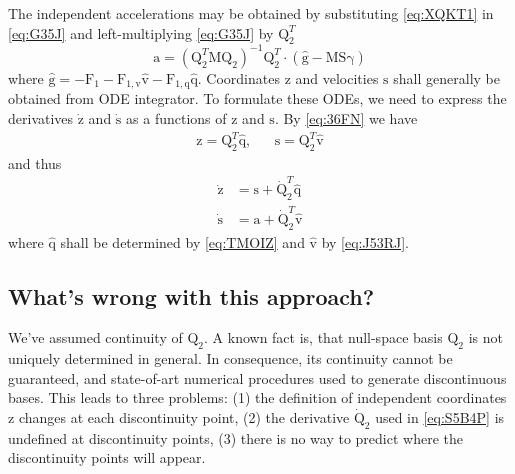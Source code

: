 \documentclass{scrartcl}
\newcommand\mMat[1]{\ensuremath{\boldsymbol{\mathrm{#1}}}}
\newcommand\mVec[1]{\ensuremath{\boldsymbol{\mathrm{#1}}}}
\begin{document}
The independent accelerations may be obtained by substituting \eqref{eq:XQKT1}
in \eqref{eq:G35J} and left-multiplying \eqref{eq:G35J} by $\mMat{Q}_2^T$
\begin{equation}
  \mVec{a} = \left(\mMat{Q}_2^T \mMat{M} \mMat{Q}_2\right)^{-1}
  \mMat{Q}_2^T \cdot \left(
      \mVec{\hat g}
    - \mMat{M} \mMat{S} \mVec{\gamma}
  \right)
\end{equation}
where $\mVec{\hat g} = - \mVec{F}_1  - \mMat{F}_{1,\mVec{v}}
\mVec{\hat v} - \mMat{F}_{1,\mVec{q}} \mVec{\hat q}$.
Coordinates $\mVec{z}$ and velocities $\mVec{s}$ shall
generally be obtained from ODE integrator. To formulate these ODEs, we need
to express the derivatives $\mVec{\dot z}$ and $\mVec{\dot
s}$ as a functions of $\mVec{z}$ and $\mVec{s}$. By
\eqref{eq:36FN} we have
\begin{align}
  & \mVec{z} = \mMat{Q}_2^T \mVec{\hat q}, &
  & \mVec{s} = \mMat{Q}_2^T \mVec{\hat v} &
  \label{eq:71BI}
\end{align}
and thus
\begin{subequations}
\label{eq:S5B4P}
\begin{align}
  \mVec{\dot z}
  & = \mVec{s} + \mMat{\dot Q}_2^T \mVec{\hat q}
\label{eq:MNLPE}
\\
\mVec{\dot s}
& = \mVec{a} + \mMat{\dot Q}_2^T \mVec{\hat v}
\label{eq:JO0II}
\end{align}
\end{subequations}
where $\mVec{\hat q}$ shall be determined by \eqref{eq:TMOIZ} and
$\mVec{\hat v}$ by \eqref{eq:J53RJ}.

\subsection{What's wrong with this approach?}

We've assumed continuity of $\mVec{Q}_2$. A known fact is, that null-space
basis $\mVec{Q}_2$ is not uniquely determined in general. In consequence, its
continuity cannot be guaranteed, and state-of-art numerical procedures used to
generate discontinuous bases. This leads to three problems: (1) the definition
of independent coordinates $\mVec{z}$ changes at each discontinuity
point, (2) the derivative $\mMat{\dot Q}_2$ used in \eqref{eq:S5B4P} is
undefined at discontinuity points, (3) there is no way to predict where the
discontinuity points will appear.
\end{document}
